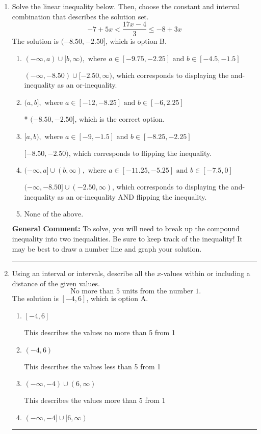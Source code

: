 \documentclass{extbook}[14pt]
\newcommand{\litem}[1]{\item #1

\rule{\textwidth}{0.4pt}}
\begin{document}
\begin{enumerate}\litem{
Solve the linear inequality below. Then, choose the constant and interval combination that describes the solution set.
\[ -7 + 5 x < \frac{17 x - 4}{3} \leq -8 + 3 x \]The solution is \( (-8.50, -2.50] \), which is option B.\begin{enumerate}[label=\Alph*.]
\item \( (-\infty, a) \cup [b, \infty), \text{ where } a \in [-9.75, -2.25] \text{ and } b \in [-4.5, -1.5] \)

$(-\infty, -8.50) \cup [-2.50, \infty)$, which corresponds to displaying the and-inequality as an or-inequality.
\item \( (a, b], \text{ where } a \in [-12, -8.25] \text{ and } b \in [-6, 2.25] \)

* $(-8.50, -2.50]$, which is the correct option.
\item \( [a, b), \text{ where } a \in [-9, -1.5] \text{ and } b \in [-8.25, -2.25] \)

$[-8.50, -2.50)$, which corresponds to flipping the inequality.
\item \( (-\infty, a] \cup (b, \infty), \text{ where } a \in [-11.25, -5.25] \text{ and } b \in [-7.5, 0] \)

$(-\infty, -8.50] \cup (-2.50, \infty)$, which corresponds to displaying the and-inequality as an or-inequality AND flipping the inequality.
\item \( \text{None of the above.} \)


\end{enumerate}

\textbf{General Comment:} To solve, you will need to break up the compound inequality into two inequalities. Be sure to keep track of the inequality! It may be best to draw a number line and graph your solution.
}
\litem{
Using an interval or intervals, describe all the $x$-values within or including a distance of the given values.
\[ \text{ No more than } 5 \text{ units from the number } 1. \]The solution is \( [-4, 6] \), which is option A.\begin{enumerate}[label=\Alph*.]
\item \( [-4, 6] \)

This describes the values no more than 5 from 1
\item \( (-4, 6) \)

This describes the values less than 5 from 1
\item \( (-\infty, -4) \cup (6, \infty) \)

This describes the values more than 5 from 1
\item \( (-\infty, -4] \cup [6, \infty) \)


\end{enumerate}}
\end{enumerate}
\end{document}

